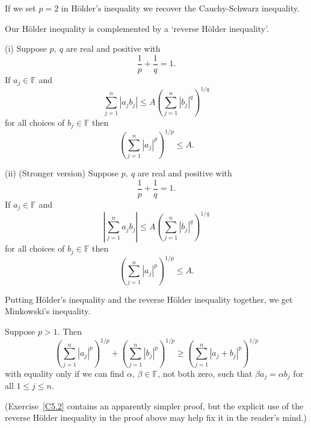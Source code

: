 If we set $p=2$ in H{\"o}lder's inequality
we recover the Cauchy-Schwarz inequality.

Our H{\"o}lder inequality is complemented by
a `reverse H{\"o}lder inequality'.
\begin{theorem} (i) Suppose $p,\ q$ are real and positive with
\[\frac{1}{p}+\frac{1}{q}=1.\]
If $a_{j}\in{\mathbb F}$ and
\[\sum_{j=1}^{n}|a_{j}b_{j}|\leq A
\left(\sum_{j=1}^{n}|b_{j}|^{q}\right)^{1/q}\]
for all choices of $b_{j}\in{\mathbb F}$  
then
\[\left(\sum_{j=1}^{n}|a_{j}|^{p}\right)^{1/p}\leq A.\]

(ii) (Stronger version) Suppose $p,\ q$ are real and positive with
\[\frac{1}{p}+\frac{1}{q}=1.\]
If $a_{j}\in{\mathbb F}$ and
\[\left|\sum_{j=1}^{n}a_{j}b_{j}\right|\leq A
\left(\sum_{j=1}^{n}|b_{j}|^{q}\right)^{1/q}\]
for all choices of $b_{j}\in{\mathbb F}$
then
\[\left(\sum_{j=1}^{n}|a_{j}|^{p}\right)^{1/p}\leq A.\]
\end{theorem}

Putting H{\"o}lder's inequality and the reverse
H{\"o}lder inequality together, we
get Minkowski's inequality.
\begin{theorem}\label{T;Minkowski} 
Suppose $p>1$. Then 
\[\left(\sum_{j=1}^{n}|a_{j}|^{p}\right)^{1/p} 
+\left(\sum_{j=1}^{n}|b_{j}|^{p}\right)^{1/p}
\geq \left(\sum_{j=1}^{n}|a_{j}+b_{j}|^{p}\right)^{1/p}\]
with equality only if we can find $\alpha,\,\beta\in{\mathbb F}$,
not both zero,
such that $\beta a_{j}=\alpha b_{j}$ for all $1\leq j\leq n$.
\end{theorem}
(Exercise~\ref{C5.2} contains an apparently simpler proof,
but the explicit use of the reverse
H{\"o}lder inequality in the proof above may help fix it 
in the reader's mind.)


